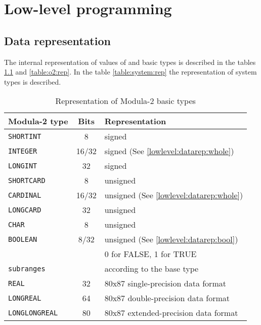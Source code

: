 \chapter{Low-level programming}\label{lowlevel}

\section{Data representation}\label{lowlevel:datarep}

The internal representation of values of \mt{}
and \ot{} basic types is described in the tables
\ref{table:m2:rep} and \ref{table:o2:rep}. In the
table \ref{table:system:rep} the representation of system
types is described.

\begin{table}
\begin{tabular}{|l|c|l|} \hline
\bf Modula-2 type  & \bf Bits &\bf Representation \\ \hline
\tt SHORTINT       & 8     & signed \\
\tt INTEGER        & 16/32 & signed (See \ref{lowlevel:datarep:whole})\\
\tt LONGINT        & 32    & signed \\
\tt SHORTCARD      & 8     & unsigned \\
\tt CARDINAL       & 16/32 & unsigned (See \ref{lowlevel:datarep:whole})\\
\tt LONGCARD       & 32    & unsigned \\
\tt CHAR           & 8     & unsigned \\
\tt BOOLEAN        & 8/32  & unsigned (See \ref{lowlevel:datarep:bool})\\
                   &       & 0 for FALSE, 1 for TRUE \\
\tt subranges      &       & according to the base type \\
\tt REAL           & 32    & 80x87 single-precision data format \\
\tt LONGREAL       & 64    & 80x87 double-precision data format \\
\tt LONGLONGREAL   & 80    & 80x87 extended-precision data format \\
\hline
\end{tabular}
\caption{Representation of Modula-2 basic types}\label{table:m2:rep}
\end{table}

